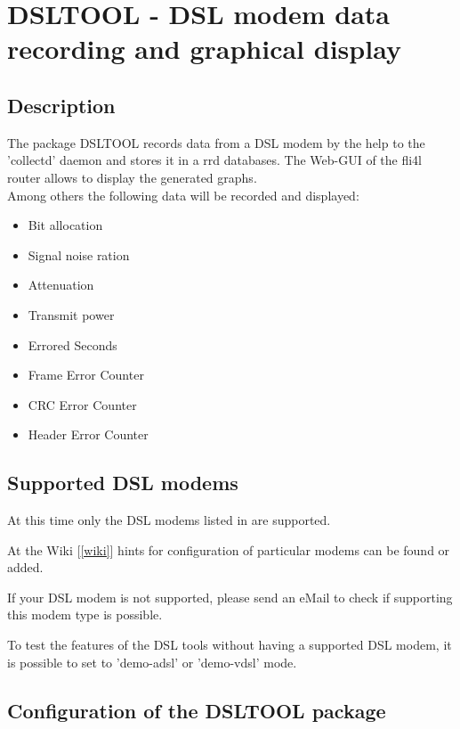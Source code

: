 \section {DSLTOOL - DSL modem data recording and graphical display}

\subsection {Description}
The package DSLTOOL records data from a DSL modem by the help to the 'collectd'
daemon and stores it in a rrd databases.
The Web-GUI of the fli4l router allows to display the generated graphs.
\\
Among others the following data will be recorded and displayed:
\begin{itemize}
  \item Bit allocation
  \item Signal noise ration
  \item Attenuation
  \item Transmit power
  \item Errored Seconds
  \item Frame Error Counter
  \item CRC Error Counter
  \item Header Error Counter
\end{itemize}

\subsection {Supported DSL modems}

  At this time only the DSL modems listed in 
  {} are supported.

  At the Wiki {[\ref{wiki}]} hints for configuration of particular modems
  can be found or added.

  If your DSL modem is not supported, please send an eMail to check
  if supporting this modem type is possible.

  To test the features of the DSL tools without having a supported DSL modem,
  it is possible to set  to
  'demo-adsl' or 'demo-vdsl' mode.

\subsection {Configuration of the DSLTOOL package}

